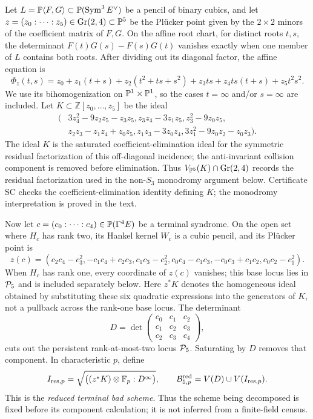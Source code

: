 \begin{definition}\label{def:terminal-bad-scheme}%
%
Let \(L=\mathbb P\langle F,G\rangle\subset\mathbb P(\operatorname{Sym}^3E^\vee)\) be a pencil of
binary cubics, and let
\(z=(z_0:\cdots:z_5)\in\operatorname{Gr}(2,4)\subset\mathbb P^5\) be
the Pl\"ucker point given by the \(2\times2\) minors of the coefficient
matrix of \(F,G\).  On the affine root chart, for distinct roots \(t,s\),
the determinant
\(F(t)G(s)-F(s)G(t)\) vanishes exactly when one member of \(L\) contains
both roots.  After dividing out its diagonal factor, the affine equation is
\[
 \Phi_z(t,s)=z_0+z_1(t+s)+z_2(t^2+ts+s^2)+z_3ts
              +z_4ts(t+s)+z_5t^2s^2 .
\]
We use its bihomogenization on \(\mathbb P^1\times\mathbb P^1\), so the cases
\(t=\infty\) and/or \(s=\infty\) are included.
Let \(K\subset\mathbb Z[z_0,\ldots,z_5]\) be the ideal
\begin{align*}
(&3z_4^2-9z_2z_5-z_3z_5, z_3z_4-3z_1z_5,
 z_3^2-9z_0z_5,\\
 &z_2z_3-z_1z_4+z_0z_5, z_1z_3-3z_0z_4,
 3z_1^2-9z_0z_2-z_0z_3).
\end{align*}
The ideal \(K\) is the saturated coefficient-elimination ideal for the
symmetric residual factorization of this off-diagonal incidence; the
anti-invariant collision component is removed before elimination.  Thus
\(V_{\mathbb P^5}(K)\cap\operatorname{Gr}(2,4)\) records the residual factorization
used in the
non-\(S_3\) monodromy argument below.  Certificate SC checks the
coefficient-elimination identity defining \(K\); the monodromy interpretation
is proved in the text.

Now let \(c=(c_0:\cdots:c_4)\in\mathbb P(\Gamma^4E)\) be a terminal syndrome.
On the open set where \(H_c\) has rank two, its Hankel kernel \(W_c\) is a
cubic pencil, and its Pl\"ucker point is
\[
 z(c)=(c_2c_4-c_3^2,-c_1c_4+c_2c_3,c_1c_3-c_2^2,
 c_0c_4-c_1c_3,-c_0c_3+c_1c_2,c_0c_2-c_1^2).
\]
When \(H_c\) has rank one, every coordinate of \(z(c)\) vanishes; this base
locus lies in \(\mathcal P_5\) and is included separately below.
Here \(z^*K\) denotes the homogeneous ideal obtained by substituting these six
quadratic expressions into the generators of \(K\), not a pullback across the
rank-one base locus.
The determinant
\[
 D=\det\begin{pmatrix}
 c_0&c_1&c_2\\c_1&c_2&c_3\\c_2&c_3&c_4
 \end{pmatrix},
\]
cuts out the persistent rank-at-most-two locus \(\mathcal P_5\).  Saturating by \(D\)
removes that component.  In characteristic \(p\), define
\[
 I_{\mathrm{res},p}
 =\sqrt{\bigl((z^*K)\otimes\mathbb F_p:D^\infty\bigr)},
 \qquad
 \mathcal B_{5,p}^{\mathrm{red}}
 =V(D)\cup V(I_{\mathrm{res},p}).
\]
This is the \emph{reduced terminal bad scheme}.  Thus the scheme being
decomposed is fixed before its component calculation; it is not inferred
from a finite-field census.
\end{definition}


